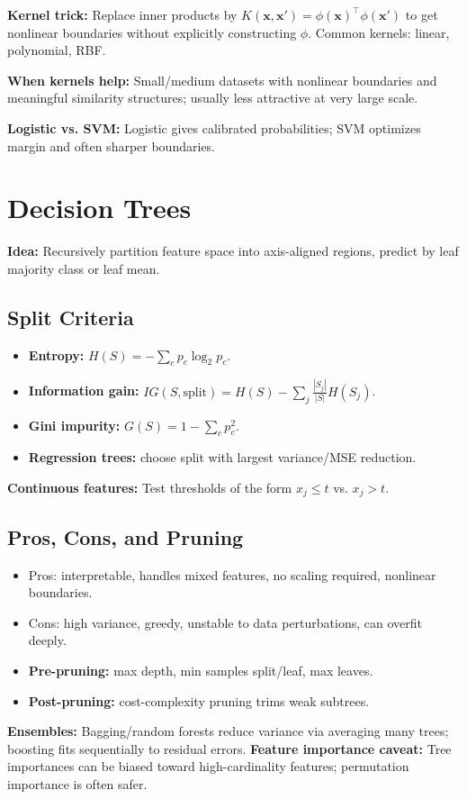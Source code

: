 \documentclass[10pt,twocolumn]{article}
\newcommand{\x}{\mathbf{x}}
\newcommand{\chead}[1]{\vspace{0.15em}\textbf{#1:} }
\begin{document}
\chead{Kernel trick} Replace inner products by $K(\x,\x')=\phi(\x)^\top\phi(\x')$ to get nonlinear boundaries without explicitly constructing $\phi$. Common kernels: linear, polynomial, RBF.\

\chead{When kernels help} Small/medium datasets with nonlinear boundaries and meaningful similarity structures; usually less attractive at very large scale.

\chead{Logistic vs. SVM} Logistic gives calibrated probabilities; SVM optimizes margin and often sharper boundaries.

\section{Decision Trees}
\chead{Idea} Recursively partition feature space into axis-aligned regions, predict by leaf majority class or leaf mean.

\subsection{Split Criteria}
\begin{itemize}
  \item \textbf{Entropy:} $H(S)=-\sum_c p_c\log_2 p_c$.
  \item \textbf{Information gain:} $IG(S,\text{split}) = H(S)-\sum_j \frac{|S_j|}{|S|}H(S_j)$.
  \item \textbf{Gini impurity:} $G(S)=1-\sum_c p_c^2$.
  \item \textbf{Regression trees:} choose split with largest variance/MSE reduction.
\end{itemize}
\chead{Continuous features} Test thresholds of the form $x_j\le t$ vs. $x_j>t$.

\subsection{Pros, Cons, and Pruning}
\begin{itemize}
  \item Pros: interpretable, handles mixed features, no scaling required, nonlinear boundaries.
  \item Cons: high variance, greedy, unstable to data perturbations, can overfit deeply.
  \item \textbf{Pre-pruning:} max depth, min samples split/leaf, max leaves.
  \item \textbf{Post-pruning:} cost-complexity pruning trims weak subtrees.
\end{itemize}
\chead{Ensembles} Bagging/random forests reduce variance via averaging many trees; boosting fits sequentially to residual errors.
\chead{Feature importance caveat} Tree importances can be biased toward high-cardinality features; permutation importance is often safer.
\end{document}
